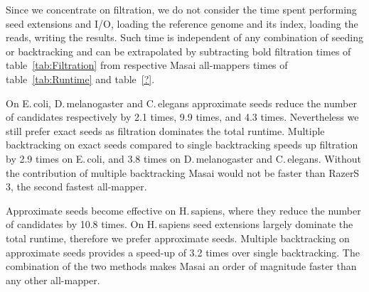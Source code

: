 Since we concentrate on filtration, we do not consider the time spent performing seed extensions and I/O, \ie loading the reference genome and its index, loading the reads, writing the results.
Such time is independent of any combination of seeding or backtracking and can be extrapolated by subtracting bold filtration times of table~\ref{tab:Filtration} from respective Masai all-mappers times of table~\ref{tab:Runtime} and table~\ref{?}.

On E.\,coli, D.\,melanogaster and C.\,elegans approximate seeds reduce the number of candidates respectively by 2.1 times, 9.9 times, and 4.3 times.
Nevertheless we still prefer exact seeds as filtration dominates the total runtime.
Multiple backtracking on exact seeds compared to single backtracking speeds up filtration by 2.9 times on E.\,coli, and 3.8 times on D.\,melanogaster and C.\,elegans.
Without the contribution of multiple backtracking Masai would not be faster than RazerS\,3, the second fastest all-mapper.

Approximate seeds become effective on H.\,sapiens, where they reduce the number of candidates by 10.8 times. 
On H.\,sapiens seed extensions largely dominate the total runtime, therefore we prefer approximate seeds.
Multiple backtracking on approximate seeds provides a speed-up of 3.2 times over single backtracking.
The combination of the two methods makes Masai an order of magnitude faster than any other all-mapper.


